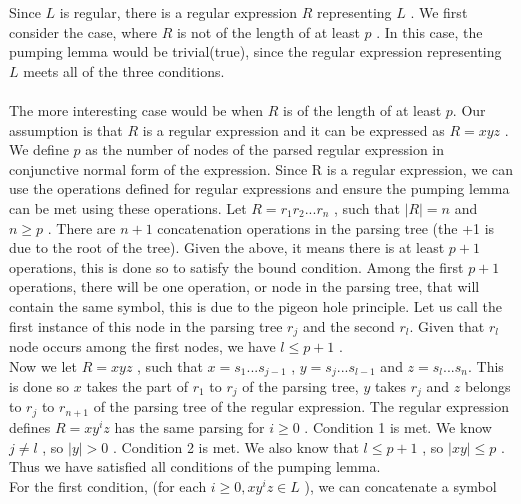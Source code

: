 \documentclass{report}
\newcommand{\me}[1]{
\begin{math}
#1
\end{math}
}
\begin{document}
Since \me{L} is regular, there is a regular expression \me{R} representing \me{L}. We first consider the case, where \me{R} is not of the length of at least \me{p}. In this case, the pumping lemma would be trivial(true), since the regular expression representing \me{L} meets all of the three conditions. 
\\ \\
 The more interesting case would be when \me{R} is of the length of at least \me{p.} Our assumption is that \me{R} is a regular expression and it can be expressed as \me{R = xyz}. We define \me{p} as the number of nodes of the parsed regular expression in conjunctive normal form of the expression. Since R is a regular expression, we can use the operations defined for regular expressions and ensure the pumping lemma can be met using these operations. Let \me{R = r_1r_2...r_n}, such that \me{|R| = n} and \me{n \geq p}. There are\me{n+1} concatenation operations in the parsing tree (the +1 is due to the root of the tree). Given the above, it means there is at least \me{p+1} operations, this is done so to satisfy the bound condition. Among the first \me{p+1} operations, there will be one operation, or node in the parsing  tree, that will contain the same symbol, this is due to the pigeon hole principle. Let us call the first instance of this node in the parsing tree \me{r_j} and the  second \me{r_l.} Given that \me{r_l} node occurs among the first nodes, we have \me{l \leq p+1}. \\
 
 Now we let \me{R =xyz}, such that \me{x=s_1...s_{j-1}} , \me{y=s_j...s_{l-1}} and \me{z=s_l ...s_n.} This is done so\me{ x} takes the part of \me{r_1} to \me{r_j} of the parsing tree, \me{y} takes \me{r_j} and \me{z} belongs to \me{r_j} to \me{r_{n+1}}  of the parsing tree of the regular expression. The regular expression defines \me{R=xy^iz} has the same parsing for \me{i \geq 0}. Condition 1 is met. We know \me{j \neq l}, so \me{|y| > 0}. Condition 2 is met. We also know that \me{l \leq p+1}, so \me{|xy| \leq p}. Thus we have satisfied all conditions of the pumping lemma.
\ \ \\
For the first condition,  (for each \me{i \geq 0, xy^iz \in L}), we can concatenate a symbol 
	


\end{document}
